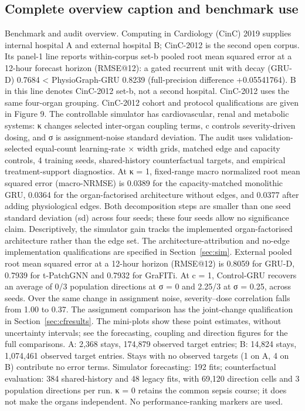 \subsection{Complete overview caption and benchmark use}\label{app:overviewcaption}
Benchmark and audit overview. Computing in Cardiology (CinC) 2019 supplies internal hospital A and external hospital B; CinC-2012 is the second open corpus. Its panel-1 line reports within-corpus set-b pooled root mean squared error at a 12-hour forecast horizon (RMSE@12): a gated recurrent unit with decay (GRU-D) 0.7684 < PhysioGraph-GRU 0.8239 (full-precision difference +0.05541764). B in this line denotes CinC-2012 set-b, not a second hospital. CinC-2012 uses the same four-organ grouping. CinC-2012 cohort and protocol qualifications are given in Figure 9. The controllable simulator has cardiovascular, renal and metabolic systems: κ changes selected inter-organ coupling terms, c controls severity-driven dosing, and σ is assignment-noise standard deviation. The audit uses validation-selected equal-count learning-rate × width grids, matched edge and capacity controls, 4 training seeds, shared-history counterfactual targets, and empirical treatment-support diagnostics. At κ = 1, fixed-range macro normalized root mean squared error (macro-NRMSE) is 0.0389 for the capacity-matched monolithic GRU, 0.0364 for the organ-factorised architecture without edges, and 0.0377 after adding physiological edges. Both decomposition steps are smaller than one seed standard deviation (sd) across four seeds; these four seeds allow no significance claim. Descriptively, the simulator gain tracks the implemented organ-factorised architecture rather than the edge set. The architecture-attribution and no-edge implementation qualifications are specified in Section~\ref{sec:sim}. External pooled root mean squared error at a 12-hour horizon (RMSE@12) is 0.8059 for GRU-D, 0.7939 for t-PatchGNN and 0.7932 for GraFITi. At c = 1, Control-GRU recovers an average of 0/3 population directions at σ = 0 and 2.25/3 at σ = 0.25, across seeds. Over the same change in assignment noise, severity–dose correlation falls from 1.00 to 0.37. The assignment comparison has the joint-change qualification in Section~\ref{sec:cfresults}. The mini-plots show these point estimates, without uncertainty intervals; see the forecasting, coupling and direction figures for the full comparisons. A: 2,368 stays, 174,879 observed target entries; B: 14,824 stays, 1,074,461 observed target entries. Stays with no observed targets (1 on A, 4 on B) contribute no error terms. Simulator forecasting: 192 fits; counterfactual evaluation: 384 shared-history and 48 legacy fits, with 69,120 direction cells and 3 population directions per run. κ = 0 retains the common sepsis course; it does not make the organs independent. No performance-ranking markers are used.


